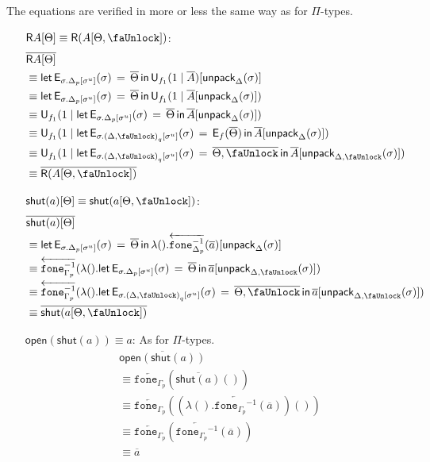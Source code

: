 \documentclass[10pt]{article}
\theoremstyle{definition}
\newcommand{\rewrite}[2]{\overleftarrow{#1}(#2)}
\newcommand\U[3]{\ensuremath{\mathsf{U}_{#1}(#2 \mid #3)}}
\newcommand\UE[2]{\ensuremath{#1(#2)}}
\newcommand\UI[2]{\ensuremath{\lambda #1.#2}}
\newcommand\EEs[4]{\ensuremath{\mathsf{let} \, \mathsf{E}_{#1}(#3) \, = \, {#2} \, \mathsf{in} \, #4}}
\newcommand\EIs[2]{\ensuremath{\mathsf{E}_{#1}{(#2)}}}
\newcommand\unpack[2]{\ensuremath{\mathsf{unpack}_{#1}(#2)}}
\newcommand\unp[2]{\ensuremath{{#2}^u}}
\newcommand{\modeof}[1]{{#1}_p}
\newcommand{\modeofq}[1]{{#1}_q}
\newcommand{\upstairs}[1]{\overline{#1}}
\newcommand\fone[1]{\ensuremath{\mathtt{fone}_{#1}}}
\newcommand\foneinv[1]{\ensuremath{\fone{#1}^{-1}}}
\newcommand{\lock}{\text{\faUnlock}}
\newcommand{\Rtype}[1]{\mathsf{R}{#1}}
\newcommand{\RI}[1]{\mathsf{shut}({#1})}
\newcommand{\RE}[1]{\mathsf{open}({#1})}
\begin{document}
The equations are verified in more or less the same way as for $\Pi$-types.
\begin{enumerate}[style = multiline, labelwidth = 80pt]
\item[{$\Rtype{A}[\Theta] \equiv \Rtype{(A[\Theta, \lock])}$}:] 
\begin{align*}
&\upstairs{\Rtype{A}[\Theta]} \\
&\equiv \EEs{\sigma.\modeof{\Delta}[\unp{\Delta}{\sigma}]}{\upstairs{\Theta}}{\sigma}{\U{f_1}{1}{\upstairs{A}}[\unpack{\Delta}{\sigma}]} \\
&\equiv \EEs{\sigma.\modeof{\Delta}[\unp{\Delta}{\sigma}]}{\upstairs{\Theta}}{\sigma}{\U{f_1}{1}{\upstairs{A}[\unpack{\Delta}{\sigma}]}} \\
&\equiv \U{f_1}{1}{\EEs{\sigma.\modeof{\Delta}[\unp{\Delta}{\sigma}]}{\upstairs{\Theta}}{\sigma}{\upstairs{A}[\unpack{\Delta}{\sigma}]}} \\
&\equiv \U{f_1}{1}{\EEs{\sigma.\modeofq{(\Delta, \lock)}[\unp{\Delta, \lock}{\sigma}]}{\EIs{f}{\upstairs{\Theta}}}{\sigma}{\upstairs{A}[\unpack{\Delta}{\sigma}]}} \\
&\equiv \U{f_1}{1}{\EEs{\sigma.\modeofq{(\Delta, \lock)}[\unp{\Delta, \lock}{\sigma}]}{\upstairs{\Theta, \lock}}{\sigma}{\upstairs{A}[\unpack{\Delta, \lock}{\sigma}]}} \\
&\equiv \upstairs{\Rtype{(A[\Theta, \lock])}}
\end{align*}

\item[{$\RI{a}[\Theta] \equiv \RI{a[\Theta, \lock]}$}:] 
\begin{align*}
&\upstairs{\RI{a}[\Theta]} \\
&\equiv \EEs{\sigma.\modeof{\Delta}[\unp{\Delta}{\sigma}]}{\upstairs{\Theta}}{\sigma}{\UI{()}{\rewrite{\foneinv{\modeof{\Delta}}}{\upstairs{a}}}[\unpack{\Delta}{\sigma}]} \\
&\equiv \rewrite{\foneinv{\modeof{\Gamma}}}{\UI{()}{\EEs{\sigma.\modeof{\Delta}[\unp{\Delta}{\sigma}]}{\upstairs{\Theta}}{\sigma}{\upstairs{a}[\unpack{\Delta, \lock}{\sigma}]}}} \\
&\equiv \rewrite{\foneinv{\modeof{\Gamma}}}{\UI{()}{\EEs{\sigma.\modeofq{(\Delta, \lock)}[\unp{\Delta}{\sigma}]}{\upstairs{\Theta, \lock}}{\sigma}{\upstairs{a}[\unpack{\Delta, \lock}{\sigma}]}}} \\
&\equiv \upstairs{\RI{a[\Theta, \lock]}}
\end{align*}

\item[{$\RE{\RI{a}} \equiv a$}:] As for $\Pi$-types.
\begin{align*}
&\upstairs{\RE{\RI{a}}} \\
&\equiv \rewrite{\fone{\modeof{\Gamma}}}{\UE{\upstairs{\RI{a}}}{}} \\
&\equiv \rewrite{\fone{\modeof{\Gamma}}}{\UE{(\UI{()}{\rewrite{\foneinv{\modeof{\Gamma}}}{\upstairs{a}}})}{}} \\
&\equiv \rewrite{\fone{\modeof{\Gamma}}}{\rewrite{\foneinv{\modeof{\Gamma}}}{\upstairs{a}}} \\
&\equiv \upstairs{a}
\end{align*}


\end{enumerate}
\end{document}
